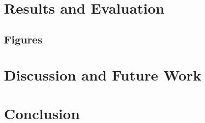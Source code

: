 \documentclass{ucl_thesis}
\def\etal{{et~al.}}
\begin{document}

\chapter{Results and Evaluation}
\label{chp:eval}
%

\section{Figures} \label{sectionExample}


\chapter{Discussion and Future Work}
\label{chp:eval}
%





\chapter{Conclusion}
\label{chp:conc}
%




\end{document}
